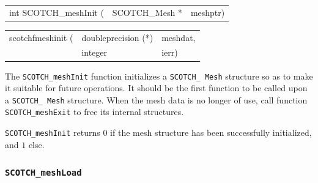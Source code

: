\begin{itemize}
\progsyn

{\tt\begin{tabular}{l@{}ll}
int SCOTCH\_meshInit ( & SCOTCH\_Mesh * & meshptr)
\end{tabular}}

{\tt\begin{tabular}{l@{}ll}
scotchfmeshinit ( & doubleprecision (*) & meshdat, \\
                  & integer             & ierr)
\end{tabular}}

\progdes

The {\tt SCOTCH\_meshInit} function initializes a {\tt SCOTCH\_\lbt
Mesh} structure so as to make it suitable for future operations. It
should be the first function to be called upon a {\tt SCOTCH\_\lbt
Mesh} structure. When the mesh data is no longer of use, call
function {\tt SCOTCH\_\lbt mesh\lbt Exit} to free its internal
structures.

\progret

{\tt SCOTCH\_meshInit} returns $0$ if the mesh structure has been
successfully initialized, and $1$ else.
\end{itemize}

\subsubsection{{\tt SCOTCH\_meshLoad}}
\label{sec-lib-func-meshload}

